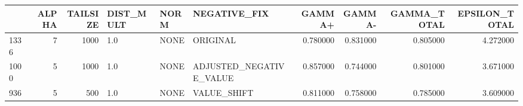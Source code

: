 \begin{tabular}{lrrlllrrrr}
\toprule
 & ALPHA & TAILSIZE & DIST_MULT & NORM & NEGATIVE_FIX & GAMMA+ & GAMMA- & GAMMA_TOTAL & EPSILON_TOTAL \\
\midrule
1336 & 7 & 1000 & 1.0 & NONE & ORIGINAL & 0.780000 & 0.831000 & 0.805000 & 4.272000 \\
1000 & 5 & 1000 & 1.0 & NONE & ADJUSTED_NEGATIVE_VALUE & 0.857000 & 0.744000 & 0.801000 & 3.671000 \\
936 & 5 & 500 & 1.0 & NONE & VALUE_SHIFT & 0.811000 & 0.758000 & 0.785000 & 3.609000 \\
\bottomrule
\end{tabular}

